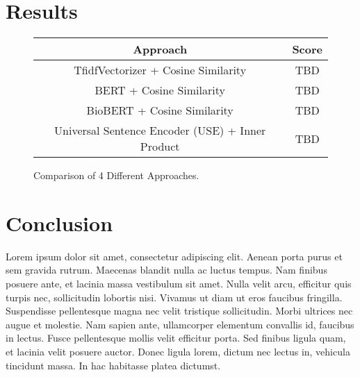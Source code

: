 \documentclass[sigconf,natbib=false]{acmart}
\begin{document}
\section{Results}

\begin{figure}[H]
  \centering
  \begin{tabular}{*{2}{c}}
    \toprule
    Approach & Score\\
    \midrule
    TfidfVectorizer + Cosine Similarity & TBD\\
    \midrule
    BERT + Cosine Similarity & TBD\\
    \midrule
    BioBERT + Cosine Similarity & TBD\\
    \midrule
    Universal Sentence Encoder (USE) + Inner Product & TBD\\
    \bottomrule
  \end{tabular}
  \caption{Comparison of 4 Different Approaches.}
\end{figure}



\section{Conclusion}

Lorem ipsum dolor sit amet, consectetur adipiscing elit. Aenean porta purus et
sem gravida rutrum. Maecenas blandit nulla ac luctus tempus. Nam finibus
posuere ante, et lacinia massa vestibulum sit amet. Nulla velit arcu, efficitur
quis turpis nec, sollicitudin lobortis nisi. Vivamus ut diam ut eros faucibus
fringilla. Suspendisse pellentesque magna nec velit tristique sollicitudin.
Morbi ultrices nec augue et molestie. Nam sapien ante, ullamcorper elementum
convallis id, faucibus in lectus. Fusce pellentesque mollis velit efficitur
porta. Sed finibus ligula quam, et lacinia velit posuere auctor. Donec ligula
lorem, dictum nec lectus in, vehicula tincidunt massa. In hac habitasse platea
dictumst.


\printbibliography%
\end{document}
